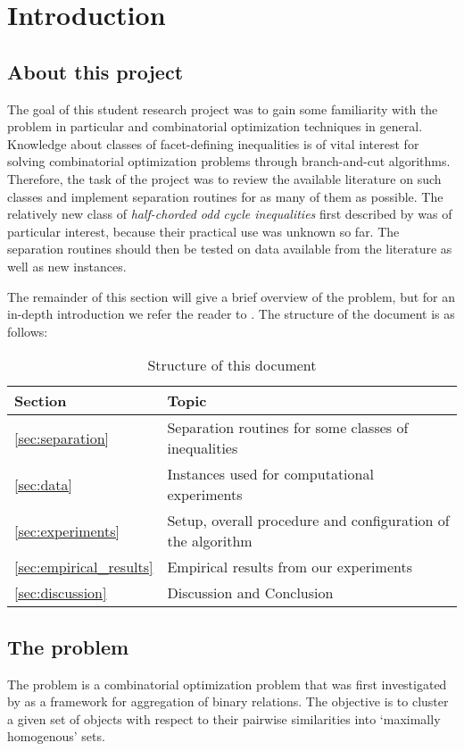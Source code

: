 \section{Introduction}
\subsection{About this project}\label{subsec:about}
The goal of this student research project was to gain some familiarity with the \CP problem in particular and combinatorial optimization techniques in general.
Knowledge about classes of facet-defining inequalities is of vital interest for solving combinatorial optimization problems through branch-and-cut algorithms.
Therefore, the task of the project was to review the available literature on such classes and implement separation routines for as many of them as possible.
The relatively new class of \textit{half-chorded odd cycle inequalities} first described by \cite{andresPolyhedralStudyLifted2022} was of particular interest, because their practical use was unknown so far.
The separation routines should then be tested on data available from the literature as well as new instances.

The remainder of this section will give a brief overview of the \CP problem, but for an in-depth introduction we refer the reader to \cite{grotschelFacetsCliquePartitioning1990}.
The structure of the document is as follows:
\begin{table}[h]
	\centering
	\begin{tabular}{@{}ll@{}}
		\toprule
		Section & Topic \\
		\midrule
		\cref{sec:separation}& Separation routines for some classes of inequalities \\
		\cref{sec:data}& Instances used for computational experiments \\
		\cref{sec:experiments}& Setup, overall procedure and configuration of the algorithm \\
		\cref{sec:empirical_results}& Empirical results from our experiments \\
		\cref{sec:discussion}& Discussion and Conclusion \\
		\bottomrule
	\end{tabular}
	\vspace{10pt}
	\caption{Structure of this document}
\end{table}

\subsection{The \CP problem}\label{subsec:cp_problem}
The \CP problem is a combinatorial optimization problem that was first investigated by \cite{grotschelFacetsCliquePartitioning1990} as a framework for aggregation of binary relations.
The objective is to cluster a given set of objects with respect to their pairwise similarities into ‘maximally homogenous’ sets.

